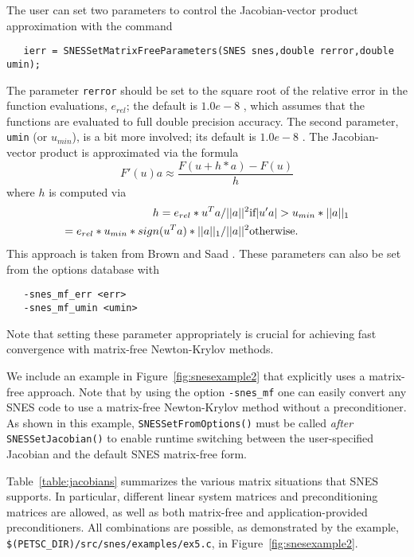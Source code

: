 The user can set two parameters to control the Jacobian-vector
product approximation with the command
\begin{verbatim}
   ierr = SNESSetMatrixFreeParameters(SNES snes,double rerror,double umin);
\end{verbatim}
The parameter {\tt rerror} should be set to the square root of the 
relative error in the function evaluations, $e_{rel}$; the default is $ 1.0e-8 $ , which assumes
that the functions are evaluated to full double precision accuracy. 
The 
second parameter, {\tt umin} (or $u_{min}$), is a bit more involved; its default is 
$ 1.0e-8 $ . The Jacobian-vector product is approximated via the formula
\[
    F'(u) a \approx \frac{F(u + h*a) - F(u)}{h}
\]
where $ h $ is computed via 
\begin{eqnarray*}
        h = e_{rel}*u^{T}a/||a||^2                       &    \hbox{if}  |u'a| > u_{min}*||a||_{1} \\
          = e_{rel}*u_{min}*sign(u^{T}a)*||a||_{1}/||a||^2  &    \hbox{otherwise}.
\end{eqnarray*}
This approach is taken from Brown and Saad \cite{brownsaad:90}.
These parameters can also be set from the options database with 
\begin{verbatim}
   -snes_mf_err <err>
   -snes_mf_umin <umin>
\end{verbatim}
 
Note that setting these parameter appropriately is crucial for achieving
fast convergence with matrix-free Newton-Krylov methods.  

We include an example in Figure~\ref{fig:snesexample2} that explicitly
uses a matrix-free approach.  Note that by using the option 
{\tt -snes\_mf} one can easily convert any SNES code to use a matrix-free
Newton-Krylov method without a preconditioner.  As shown in this
example, {\tt SNESSetFromOptions()} must be called {\em after}
{\tt SNESSetJacobian()} to enable runtime switching between the
user-specified Jacobian and the default SNES matrix-free form.

Table~\ref{table:jacobians} summarizes the various matrix situations
that SNES supports.  In particular, different linear system matrices
and preconditioning matrices are allowed, as well as both matrix-free
and application-provided preconditioners.  All combinations are
possible, as demonstrated by the example, 
{\tt \$(PETSC\_DIR)/src/snes/\-examples/ex5.c},
 in Figure~\ref{fig:snesexample2}.

